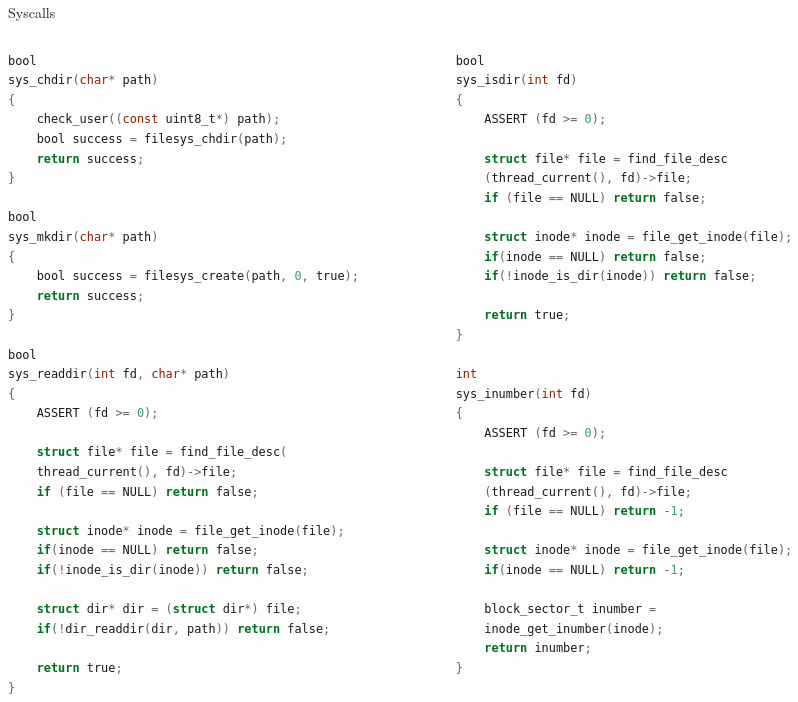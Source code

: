 \documentclass[10pt]{beamer}
\begin{document}
\begin{frame}[fragile]{Syscalls}
\begin{columns}
\begin{column}{0.5\textwidth}
\begin{lstlisting}[language=C]
bool 
sys_chdir(char* path)
{
    check_user((const uint8_t*) path);
    bool success = filesys_chdir(path);
    return success;
}

bool 
sys_mkdir(char* path)
{
    bool success = filesys_create(path, 0, true);
    return success;
}

bool 
sys_readdir(int fd, char* path)
{
    ASSERT (fd >= 0);
    
    struct file* file = find_file_desc(
    thread_current(), fd)->file;
    if (file == NULL) return false;
    
    struct inode* inode = file_get_inode(file);
    if(inode == NULL) return false;
    if(!inode_is_dir(inode)) return false;
    
    struct dir* dir = (struct dir*) file;
    if(!dir_readdir(dir, path)) return false;
    
    return true;
}
\end{lstlisting}
\end{column}
\begin{column}{0.5\textwidth}
\begin{lstlisting}[language=C]
bool 
sys_isdir(int fd)
{
    ASSERT (fd >= 0);

    struct file* file = find_file_desc
    (thread_current(), fd)->file;
    if (file == NULL) return false;

    struct inode* inode = file_get_inode(file);
    if(inode == NULL) return false;
    if(!inode_is_dir(inode)) return false;
    
    return true;
}

int 
sys_inumber(int fd)
{
    ASSERT (fd >= 0);

    struct file* file = find_file_desc
    (thread_current(), fd)->file;
    if (file == NULL) return -1;

    struct inode* inode = file_get_inode(file);
    if(inode == NULL) return -1;

    block_sector_t inumber = 
    inode_get_inumber(inode);
    return inumber;
}
\end{lstlisting}
\end{column}
\end{columns}
\end{frame}
\end{document}
